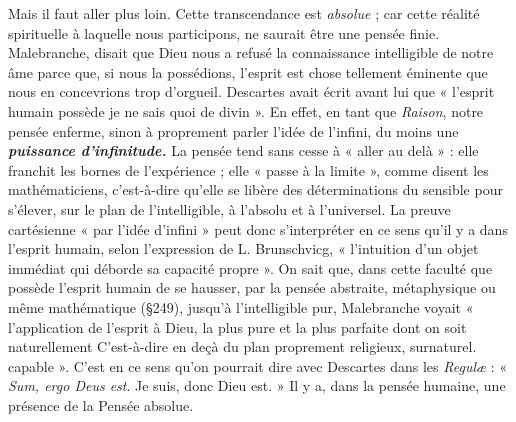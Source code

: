 Mais il faut aller plus loin. Cette transcendance est {\it absolue} ; car cette
réalité spirituelle à laquelle nous participons, ne saurait être une pensée
finie. Malebranche, disait que Dieu nous a refusé la connaissance
intelligible de notre âme parce que, si nous la possédions, l'esprit est
chose tellement éminente que nous en concevrions trop d’orgueil.
Descartes avait écrit avant lui que « l'esprit humain possède je ne
sais quoi de divin ». En effet, en tant que {\it Raison}, notre pensée
enferme, sinon à proprement parler l'idée de l'infini, du moins une
\textbf{\textit {puissance d’infinitude.}} La pensée tend sans cesse à « aller au delà » :
elle franchit les bornes de l’expérience ; elle « passe à la limite »,
comme disent les mathématiciens, c’est-à-dire qu’elle se libère des
déterminations du sensible pour s'élever, sur le plan de l'intelligible,
à l’absolu et à l’universel. La preuve cartésienne « par l’idée
d’infini » peut donc s’interpréter en ce sens qu’il y a dans l'esprit
humain, selon l’expression de L. Brunschvicg, « l'intuition d’un
objet immédiat qui déborde sa capacité propre ». On sait que, dans
cette faculté que possède l’esprit humain de se hausser, par la pensée
abstraite, métaphysique ou même mathématique (\S 249), jusqu’à
l'intelligible pur, Malebranche voyait « l’application de l’esprit à
Dieu, la plus pure et la plus parfaite dont on soit naturellement
{\scriptsize C'est-à-dire en deçà du plan proprement religieux, surnaturel.}
capable ». C’est en ce sens qu’on pourrait dire avec Descartes dans
les {\it Regulæ} : « {\it Sum, ergo Deus est}. Je suis, donc Dieu est. » Il y a, dans
la pensée humaine, une présence de la Pensée absolue.
